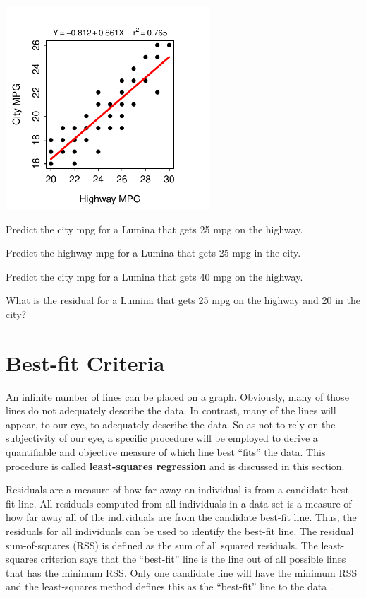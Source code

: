 \documentclass[10pt,openany]{book}\usepackage[]{graphicx}\usepackage[]{color}
\begin{document}
\begin{exsection}
\begin{center}
  \includegraphics[width=3in]{Figs/LuminaFLP-1}
\end{center}
    \begin{Enumerate}
      \item Predict the city mpg for a Lumina that gets 25 mpg on the highway.
      \item Predict the highway mpg for a Lumina that gets 25 mpg in the city.
      \item Predict the city mpg for a Lumina that gets 40 mpg on the highway.
      \item What is the residual for a Lumina that gets 25 mpg on the highway and 20 in the city?
    \end{Enumerate}
\end{exsection}

\vspace{-24pt}
\section{Best-fit Criteria}\label{sect:BestFitLine}
An infinite number of lines can be placed on a graph.  Obviously, many of those lines do not adequately describe the data.  In contrast, many of the lines will appear, to our eye, to adequately describe the data.  So as not to rely on the subjectivity of our eye, a specific procedure will be employed to derive a quantifiable and objective measure of which line best ``fits'' the data.  This procedure is called \textbf{least-squares regression} and is discussed in this section.

Residuals are a measure of how far away an individual is from a candidate best-fit line.  All residuals computed from all individuals in a data set is a measure of how far away all of the individuals are from the candidate best-fit line.  Thus, the residuals for all individuals can be used to identify the best-fit line.  The residual sum-of-squares (RSS) is defined as the sum of all squared residuals.  The least-squares criterion says that the ``best-fit'' line is the line out of all possible lines that has the minimum RSS.  Only one candidate line will have the minimum RSS and the least-squares method defines this as the ``best-fit'' line to the data .
\end{document}
